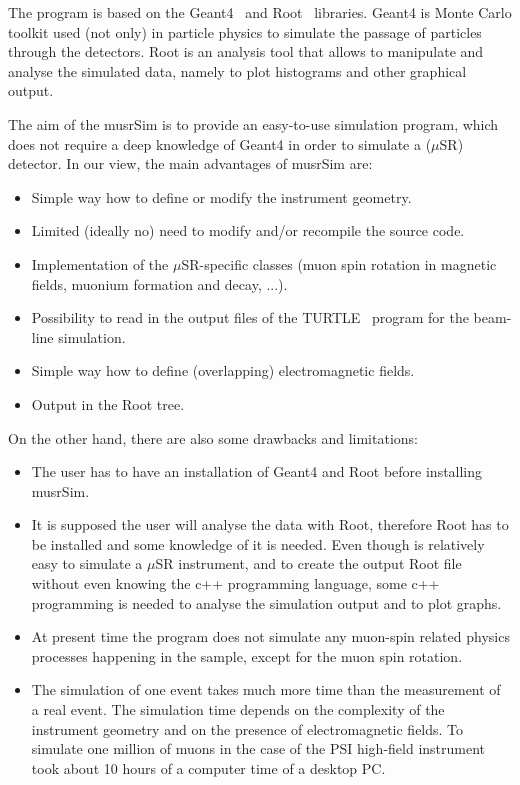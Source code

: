 \documentclass[twoside]{dis04}
\begin{document}
The program is based on the Geant4~\cite{geant} and Root~\cite{root} libraries.
Geant4 is Monte Carlo toolkit used (not only) in particle physics to simulate
the passage of particles through the detectors.
Root is an analysis tool that allows to manipulate and analyse the simulated data, 
namely to plot histograms and other graphical output.

The aim of the musrSim is to provide an easy-to-use simulation program, which does
not require a deep knowledge of Geant4 in order to simulate a ($\mu$SR) detector.
In our view, the main advantages of musrSim are:
\begin{itemize}
	\item Simple way how to define or modify the instrument geometry.
	\item Limited (ideally no) need to modify and/or recompile the source code.
	\item Implementation of the  $\mu$SR-specific classes (muon spin rotation
	      in magnetic fields, muonium formation and decay, ...).
	\item Possibility to read in the output files of the TURTLE~\cite{turtle}
	      program for the beam-line simulation.
	\item Simple way how to define (overlapping) electromagnetic fields.
	\item Output in the Root tree.
\end{itemize}
%
On the other hand, there are also some drawbacks and limitations:
\begin{itemize}
	\item The user has to have an installation of Geant4 and Root before installing musrSim. 
	\item It is supposed the user will analyse the data with Root, therefore
	      Root has to be installed and some knowledge of it is needed.
	      Even though is relatively easy to simulate a $\mu$SR instrument, 
	      and to create the output Root file without even knowing the c++ 
              programming language, some c++ programming is needed to 
	      analyse the simulation output and to plot graphs.
	\item At present time the program does not simulate any muon-spin related
              physics processes happening in the sample, except for the muon 
              spin rotation.
	\item The simulation of one event takes much more time than the measurement
	      of a real event. The simulation time depends on the
	      complexity of the instrument geometry and on the presence of
	      electromagnetic fields.  To simulate one million of muons
	      in the case of the PSI high-field instrument took about 10 hours
	      of a computer time of a desktop PC.
\end{itemize}
\end{document}
